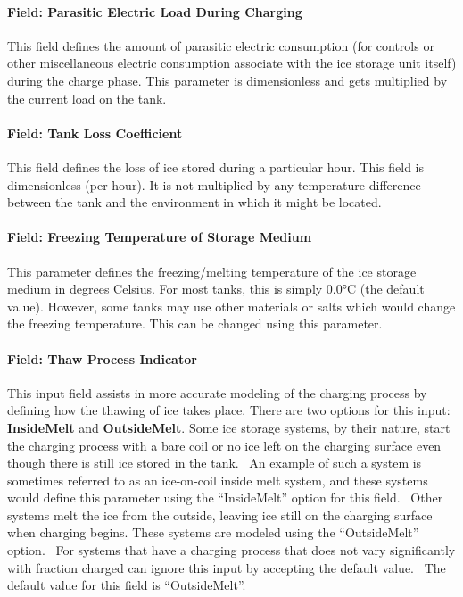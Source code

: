 \paragraph{Field: Parasitic Electric Load During Charging}\label{field-parasitic-electric-load-during-charging}

This field defines the amount of parasitic electric consumption (for controls or other miscellaneous electric consumption associate with the ice storage unit itself) during the charge phase. This parameter is dimensionless and gets multiplied by the current load on the tank.

\paragraph{Field: Tank Loss Coefficient}\label{field-tank-loss-coefficient}

This field defines the loss of ice stored during a particular hour. This field is dimensionless (per hour). It is not multiplied by any temperature difference between the tank and the environment in which it might be located.

\paragraph{Field: Freezing Temperature of Storage Medium}\label{field-freezing-temperature-of-storage-medium}

This parameter defines the freezing/melting temperature of the ice storage medium in degrees Celsius. For most tanks, this is simply 0.0°C (the default value). However, some tanks may use other materials or salts which would change the freezing temperature. This can be changed using this parameter.

\paragraph{Field: Thaw Process Indicator}\label{field-thaw-process-indicator}

This input field assists in more accurate modeling of the charging process by defining how the thawing of ice takes place. There are two options for this input: \textbf{InsideMelt} and \textbf{OutsideMelt}. Some ice storage systems, by their nature, start the charging process with a bare coil or no ice left on the charging surface even though there is still ice stored in the tank.~ An example of such a system is sometimes referred to as an ice-on-coil inside melt system, and these systems would define this parameter using the ``InsideMelt'' option for this field.~ Other systems melt the ice from the outside, leaving ice still on the charging surface when charging begins. These systems are modeled using the ``OutsideMelt'' option.~ For systems that have a charging process that does not vary significantly with fraction charged can ignore this input by accepting the default value.~ The default value for this field is ``OutsideMelt''.


